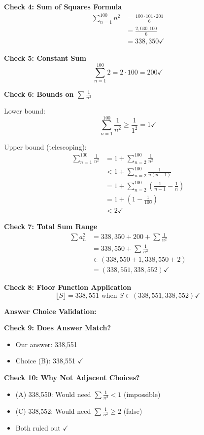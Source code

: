 \documentclass[12pt]{article}
\begin{document}
\begin{verificationbox}
\textbf{Check 4: Sum of Squares Formula}
\begin{align*}
\sum_{n=1}^{100} n^2 &= \frac{100 \cdot 101 \cdot 201}{6} \\
&= \frac{2{,}030{,}100}{6} \\
&= 338{,}350 \checkmark
\end{align*}

\textbf{Check 5: Constant Sum}
\[\sum_{n=1}^{100} 2 = 2 \cdot 100 = 200 \checkmark\]

\textbf{Check 6: Bounds on $\sum \frac{1}{n^2}$}

Lower bound:
\[\sum_{n=1}^{100} \frac{1}{n^2} \geq \frac{1}{1^2} = 1 \checkmark\]

Upper bound (telescoping):
\begin{align*}
\sum_{n=1}^{100} \frac{1}{n^2} &= 1 + \sum_{n=2}^{100} \frac{1}{n^2} \\
&< 1 + \sum_{n=2}^{100} \frac{1}{n(n-1)} \\
&= 1 + \sum_{n=2}^{100} \left(\frac{1}{n-1} - \frac{1}{n}\right) \\
&= 1 + \left(1 - \frac{1}{100}\right) \\
&< 2 \checkmark
\end{align*}

\textbf{Check 7: Total Sum Range}
\begin{align*}
\sum a_n^2 &= 338{,}350 + 200 + \sum \frac{1}{n^2} \\
&= 338{,}550 + \sum \frac{1}{n^2} \\
&\in (338{,}550 + 1, 338{,}550 + 2) \\
&= (338{,}551, 338{,}552) \checkmark
\end{align*}

\textbf{Check 8: Floor Function Application}
\[\lfloor S \rfloor = 338{,}551 \text{ when } S \in (338{,}551, 338{,}552) \checkmark\]

\textbf{Answer Choice Validation:}

\textbf{Check 9: Does Answer Match?}
\begin{itemize}
    \item Our answer: 338,551
    \item Choice (B): 338,551 $\checkmark$
\end{itemize}

\textbf{Check 10: Why Not Adjacent Choices?}
\begin{itemize}
    \item (A) 338,550: Would need $\sum \frac{1}{n^2} < 1$ (impossible)
    \item (C) 338,552: Would need $\sum \frac{1}{n^2} \geq 2$ (false)
    \item Both ruled out $\checkmark$
\end{itemize}


\end{verificationbox}
\end{document}
